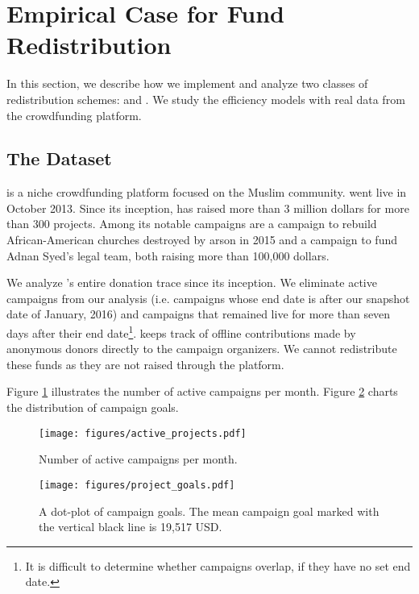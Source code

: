 
\section{Empirical Case for Fund Redistribution}

In this section, we describe how we implement and analyze two classes of redistribution schemes: \car and \cpr. We study the efficiency models with real data from the \lag crowdfunding platform.

\subsection{The \lag Dataset}
\label{sec:data}

\textit{\lag} is a niche crowdfunding platform focused on the Muslim community. \lag went live in October 2013. Since its inception, \lag has raised more than 3 million dollars for more than 300 projects. Among its notable campaigns are a campaign to rebuild African-American churches destroyed by arson in 2015 and a campaign to fund Adnan Syed's legal team, both raising more than 100,000 dollars.


We analyze \lag's entire donation trace since its inception. We eliminate active campaigns from our analysis (i.e. campaigns whose end date is after our snapshot date of January, 2016) and campaigns that remained live for more than seven days after their end date\footnote{It is difficult to determine whether campaigns overlap, if they have no set end date.}. \lag keeps track of offline contributions made by anonymous donors directly to the campaign organizers. We cannot redistribute these funds as they are not raised through the platform.

Figure \ref{fig:over-time} illustrates the number of active campaigns per month. Figure \ref{fig:goals} charts the distribution of campaign goals.

\begin{figure}[htbp]
    \centering
    \texttt{[image: figures/active\_projects.pdf]}
    \caption{Number of active campaigns per month.}
    \label{fig:over-time}
\end{figure}

\begin{figure}[htbp]
    \centering
    \texttt{[image: figures/project\_goals.pdf]}
    \caption{A dot-plot of campaign goals. The mean campaign goal marked with the vertical black line is 19,517 USD.}
    \label{fig:goals}
\end{figure}



